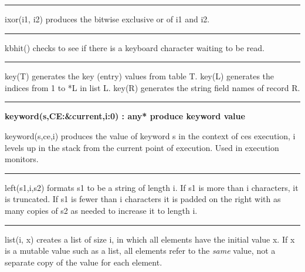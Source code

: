 \bigskip\hrule\vspace{0.1cm}

\noindent
\textsf{ixor(i1, i2)} produces the bitwise exclusive
or of \textsf{i1} and \textsf{i2}.

\bigskip\hrule\vspace{0.1cm}

\noindent
{}\textsf{kbhit()} checks to see if there is a
keyboard character waiting to be read.

\bigskip\hrule\vspace{0.1cm}

\noindent
{}\textsf{key(T)} generates the key (entry) values from
table \textsf{T}. \textsf{key(L)} generates the indices from 1 to
\textsf{*L} in list \textsf{L}. \textsf{key(R)} generates the string
field names of record R.

\bigskip\hrule\vspace{0.1cm}
\noindent
{\bf keyword(s,CE:\&current,i:0) : any* \hfill produce keyword value}

\noindent
{}\textsf{keyword(s,ce,i)} produces the value of keyword
\textsf{s} in the context of \textsf{ce}{\textquotesingle}s execution,
\textsf{i} levels up in the stack from the current point of execution.
Used in execution monitors.

\bigskip\hrule\vspace{0.1cm}

\noindent
{}\textsf{left(s1,i,s2)} formats \textsf{s1} to be a string
of length \textsf{i}. If \textsf{s1} is more than \textsf{i}
characters, it is truncated. If \textsf{s1} is fewer than \textsf{i}
characters it is padded on the right with as many copies of \textsf{s2}
as needed to increase it to length \textsf{i}.

\bigskip\hrule\vspace{0.1cm}

\noindent
{}\textsf{list(i, x)} creates a list of size \textsf{i},
in which all elements have the initial value \textsf{x}. If \textsf{x}
is a mutable value such as a list, all elements refer to the
\textit{same} value, not a separate copy of the value for each element.

